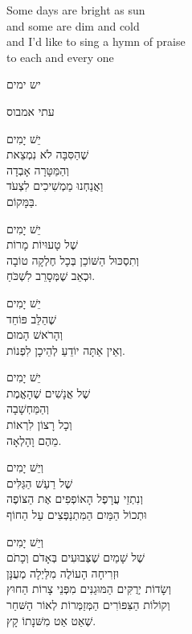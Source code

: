 \documentclass{article}
\begin{document}
        Some days are bright as sun \\
        and some are dim and cold \\
        and I'd like to sing a hymn of praise \\
        to each and every one

    \pagebreak

    \begin{hebrew}

        \begin{center}
          {\huge יש ימים}

          {\Large עתי אמבוס}
        \end{center}

        \maketitle

        יֵשׁ יָמִים \\
        שֶׁהַסִּבָּה לֹא נִמְצֵאת \\
        וְהַמַּטָּרָה אָבְדָה \\
        וַאֲנַחְנוּ מַמְשִׁיכִים לִצְעֹד \\
        בַּמָּקוֹם.

        יֵשׁ יָמִים \\
        שֶׁל טָעוּיוֹת מָרוֹת \\
        וְתִסְכּוּל הַשּׁוֹכֵן בְּכָל חֶלְקָה טוֹבָה \\
        וּכְאֵב שֶׁמְּסָרֵב לִשְׁכֹּחַ.

        יֵשׁ יָמִים \\
        שֶׁהַלֵּב פּוֹחֵד \\
        וְהָרֹאשׁ הָמוּם \\
        וְאֵין אַתָּה יוֹדֵעַ לְהֵיכָן לִפְנוֹת.

        יֵשׁ יָמִים \\
        שֶׁל אֲנָשִׁים שֶׁהָאֱמֶת \\
        וְהַמַּחְשָׁבָה \\
        וְכָל רָצוֹן לִרְאוֹת \\
        מֵהֶם וָהָלְאָה.


        וְיֵשׁ יָמִים \\
        שֶׁל רַעַשׁ הַגַּלִּים \\
        וְנִתְזֵי עֲרָפֶל הָאוֹפְפִים אֶת הַצּוֹפֶה \\
        וּתְכוֹל הַמַּיִם הַמִּתְנַפְּצִים עַל הַחוֹף

        וְיֵשׁ יָמִים \\
        שֶׁל שָׁמַיִם שֶׁצְּבוּעִים בְּאָדֹם וְכָתֹם \\
        וּזְרִיחָה הָעוֹלֶה מִלַּיְלָה מְעֻנָּן \\
        וְשָׂדוֹת יְרֻקִּים הַמּוּגַנִּים מִפְּנֵי צָרוֹת הַחוּץ \\
        וְקוֹלוֹת הַצִּפּוֹרִים הַמְּזַמְּרוֹת לְאוֹר הַשּׁחַר \\
        שְׁאַט אַט מִשּׁנָתוֹ קָץ.


\end{hebrew}
\end{document}
